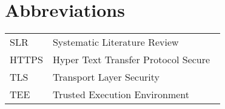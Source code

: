 \chapter*{Abbreviations}

\begin{flushleft}
\begin{tabular}{l p{0.8\linewidth}}
SLR      & Systematic Literature Review\\
HTTPS    & Hyper Text Transfer Protocol Secure\\
TLS      & Transport Layer Security\\
TEE      & Trusted Execution Environment\\
\end{tabular}
\end{flushleft}
